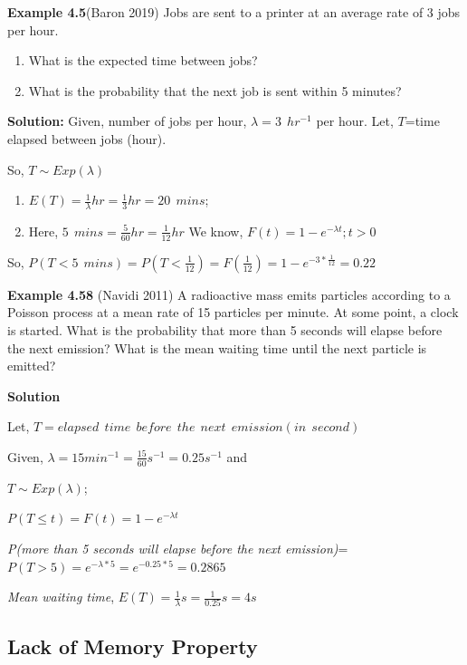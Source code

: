 \documentclass[
  11pt,
  letterpaper,
  DIV=11,
  numbers=noendperiod]{scrreprt}
\begin{document}
\textbf{Example 4.5}(Baron 2019) Jobs are sent to a printer at an
average rate of 3 jobs per hour.

\begin{enumerate}
\def\labelenumi{(\alph{enumi})}
\item
  What is the expected time between jobs?
\item
  What is the probability that the next job is sent within 5 minutes?
\end{enumerate}

\textbf{Solution:} Given, number of jobs per hour,
\(\lambda=3\ \ hr^{-1}\) per hour. Let, \(T\)=time elapsed between jobs
(hour).

So, \(T\sim Exp(\lambda)\)

\begin{enumerate}
\def\labelenumi{(\alph{enumi})}
\item
  \(E(T)=\frac{1}{\lambda} hr=\frac{1}{3} hr=20\ \ mins\);
\item
  Here, \(5 \ \ mins=\frac{5}{60} hr=\frac{1}{12} hr\) We know,
  \(F(t)=1-e^{-\lambda t}; t>0\)
\end{enumerate}

So,
\(P(T<5 \ \ mins)=P(T<\frac{1}{12})=F(\frac{1}{12})=1-e^{-3*\frac{1}{12}}=0.22\)

\textbf{Example 4.58} (Navidi 2011) A radioactive mass emits particles
according to a Poisson process at a mean rate of 15 particles per
minute. At some point, a clock is started. What is the probability that
more than 5 seconds will elapse before the next emission? What is the
mean waiting time until the next particle is emitted?

\textbf{Solution}

Let,
\(T=elapsed \ \ time \ \ before \ \ the \ \ next \ \ emission (in \ \ second)\)

Given, \(\lambda=15 min^{-1}=\frac{15}{60} s^{-1}=0.25 s^{-1}\) and

\(T\sim Exp(\lambda)\);

\(P(T\le t)=F(t)=1-e^{-\lambda t}\)

\emph{P(more than 5 seconds will elapse before the next
emission)}=\(P(T>5)=e^{-\lambda * 5}=e^{-0.25*5}=0.2865\)

\emph{Mean waiting time},
\(E(T)=\frac{1}{\lambda} s=\frac{1}{0.25}s=4s\)

\subsection{Lack of Memory Property}\label{lack-of-memory-property}
\end{document}
